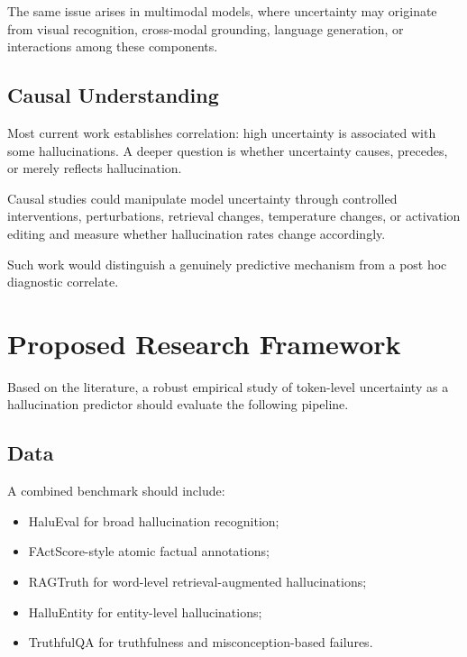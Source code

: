 \documentclass[11pt]{article}
\begin{document}
The same issue arises in multimodal models, where uncertainty may originate from visual recognition, cross-modal grounding, language generation, or interactions among these components.

\subsection{Causal Understanding}
\label{sec:causal}

Most current work establishes correlation: high uncertainty is associated with some hallucinations. A deeper question is whether uncertainty causes, precedes, or merely reflects hallucination.

Causal studies could manipulate model uncertainty through controlled interventions, perturbations, retrieval changes, temperature changes, or activation editing and measure whether hallucination rates change accordingly.

Such work would distinguish a genuinely predictive mechanism from a post hoc diagnostic correlate.

\section{Proposed Research Framework}
\label{sec:framework}

Based on the literature, a robust empirical study of token-level uncertainty as a hallucination predictor should evaluate the following pipeline.

\subsection{Data}
\label{sec:framework-data}

A combined benchmark should include:

\begin{itemize}
    \item HaluEval for broad hallucination recognition;
    \item FActScore-style atomic factual annotations;
    \item RAGTruth for word-level retrieval-augmented hallucinations;
    \item HalluEntity for entity-level hallucinations;
    \item TruthfulQA for truthfulness and misconception-based failures.
\end{itemize}
\end{document}

